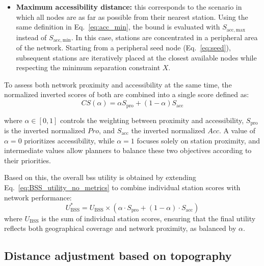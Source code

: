 \begin{itemize}
            \item \textbf{Maximum accessibility distance:} this corresponds to the scenario in which all nodes are as far as possible from their nearest station. Using the same definition in Eq.~\ref{eq:acc_min}, the bound is evaluated with $S_{\mathrm{acc,max}}$ instead of $S_{\mathrm{acc,min}}$. In this case, stations are concentrated in a peripheral area of the network. Starting from a peripheral seed node (Eq.~\ref{eq:seed}), subsequent stations are iteratively placed at the closest available nodes while respecting the minimum separation constraint $X$.
        \end{itemize}
            

        To assess both network proximity and accessibility at the same time, the normalized inverted scores of both are combined into a single score defined as:
            \begin{equation}
                CS(\alpha) = \alpha S_{\text{pro}} + (1 - \alpha) S_{\text{acc}}
            \end{equation}
        
        where $\alpha \in [0,1]$ controls the weighting between proximity and accessibility, $S_{\text{pro}}$ is the inverted normalized $Pro$, and $S_{\text{acc}}$ the inverted normalized $Acc$. A value of $\alpha = 0$ prioritizes accessibility, while $\alpha = 1$ focuses solely on station proximity, and intermediate values allow planners to balance these two objectives according to their priorities.


        Based on this, the overall \ac{bss} utility is obtained by extending Eq.~\ref{eq:BSS_utility_no_metrics} to combine individual station scores with network performance: 
            \begin{equation} \label{eq:full_formula}
                U_{\text{BSS}}^* = U_{\text{BSS}} \times \left( \alpha \cdot S_{\text{pro}} + (1 - \alpha) \cdot S_{\text{acc}} \right)
            \end{equation}
        where $U_{\text{BSS}}$ is the sum of individual station scores, ensuring that the final utility reflects both geographical coverage and network proximity, as balanced by $\alpha$.

    \subsection{Distance adjustment based on topography}
    \label{sec:slopes}
    
